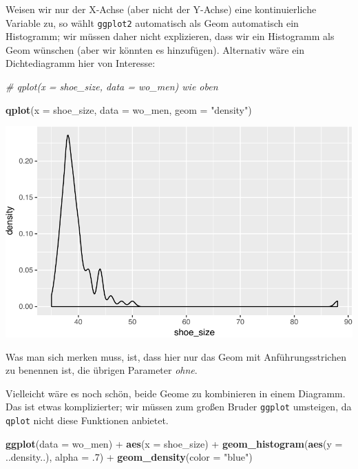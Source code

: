 \documentclass[12pt,ngerman,]{book}
\newenvironment{Shaded}{\begin{snugshade}}{\end{snugshade}}
\newcommand{\KeywordTok}[1]{\textcolor[rgb]{0.13,0.29,0.53}{\textbf{{#1}}}}
\newcommand{\DataTypeTok}[1]{\textcolor[rgb]{0.13,0.29,0.53}{{#1}}}
\newcommand{\DecValTok}[1]{\textcolor[rgb]{0.00,0.00,0.81}{{#1}}}
\newcommand{\StringTok}[1]{\textcolor[rgb]{0.31,0.60,0.02}{{#1}}}
\newcommand{\CommentTok}[1]{\textcolor[rgb]{0.56,0.35,0.01}{\textit{{#1}}}}
\newcommand{\NormalTok}[1]{{#1}}
\renewenvironment{Shaded}{\begin{kframe}}{\end{kframe}}
\begin{document}
Weisen wir nur der X-Achse (aber nicht der Y-Achse) eine kontinuierliche
Variable zu, so wählt \texttt{ggplot2} automatisch als Geom automatisch
ein Histogramm; wir müssen daher nicht explizieren, dass wir ein
Histogramm als Geom wünschen (aber wir könnten es hinzufügen).
Alternativ wäre ein Dichtediagramm hier von Interesse:

\begin{Shaded}
\begin{Highlighting}[]
\CommentTok{# qplot(x = shoe_size, data = wo_men)  wie oben}

\KeywordTok{qplot}\NormalTok{(}\DataTypeTok{x =} \NormalTok{shoe_size, }\DataTypeTok{data =} \NormalTok{wo_men, }\DataTypeTok{geom =} \StringTok{"density"}\NormalTok{)}
\end{Highlighting}
\end{Shaded}

\begin{center}\includegraphics[width=0.7\linewidth]{050_Daten_visualisieren_files/figure-latex/unnamed-chunk-7-1} \end{center}

Was man sich merken muss, ist, dass hier nur das Geom mit
Anführungsstrichen zu benennen ist, die übrigen Parameter \emph{ohne}.

Vielleicht wäre es noch schön, beide Geome zu kombinieren in einem
Diagramm. Das ist etwas komplizierter; wir müssen zum großen Bruder
\texttt{ggplot} umsteigen, da \texttt{qplot} nicht diese Funktionen
anbietet.

\begin{Shaded}
\begin{Highlighting}[]
\KeywordTok{ggplot}\NormalTok{(}\DataTypeTok{data =} \NormalTok{wo_men) +}
\StringTok{  }\KeywordTok{aes}\NormalTok{(}\DataTypeTok{x =} \NormalTok{shoe_size) +}
\StringTok{  }\KeywordTok{geom_histogram}\NormalTok{(}\KeywordTok{aes}\NormalTok{(}\DataTypeTok{y =} \NormalTok{..density..), }\DataTypeTok{alpha =} \NormalTok{.}\DecValTok{7}\NormalTok{) +}
\StringTok{  }\KeywordTok{geom_density}\NormalTok{(}\DataTypeTok{color =} \StringTok{"blue"}\NormalTok{)}
\end{Highlighting}
\end{Shaded}
\end{document}
